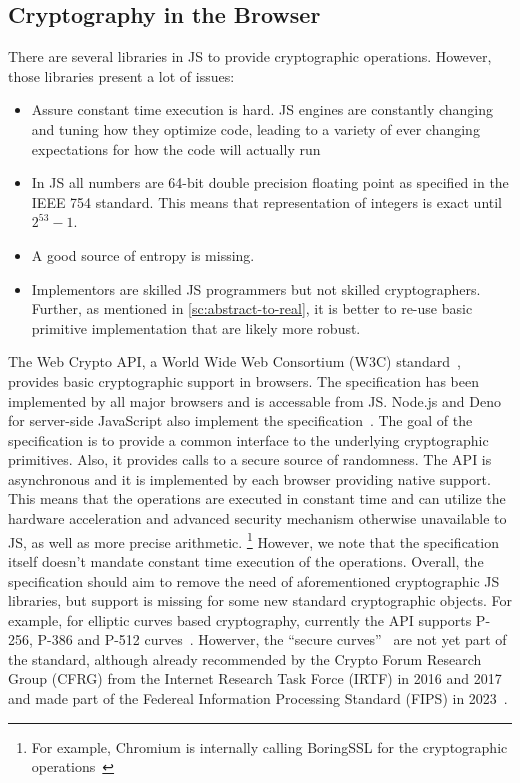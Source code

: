 \subsection{Cryptography in the Browser}\label{sc:webcrypto-api}

There are several libraries in JS to provide cryptographic
operations.
However, those libraries present a lot of issues:
\begin{itemize}
    \item Assure constant time execution is hard. JS engines are constantly changing and tuning how they optimize code, leading to a variety of ever changing expectations for how the code will actually run
    \item In JS all numbers are 64-bit double precision floating point as specified in the IEEE 754 standard. This means that representation of integers is exact until $2^{53} - 1$.
    \item A good source of entropy is missing.
    \item Implementors are skilled JS programmers but not skilled cryptographers. Further, as mentioned in \cref{sc:abstract-to-real}, it is better to re-use basic primitive implementation that are likely more robust. 
\end{itemize}

The Web Crypto API, a World Wide Web Consortium (W3C) standard~\cite{WebCryptoAPISpecification}, 
provides basic cryptographic support in browsers.
The specification has been implemented by all major browsers
and is accessable from JS. 
Node.js and Deno for server-side JavaScript also implement the specification~\cite{NodeJsWebCryptoAPI, DenoWebCryptoAPI}.
The goal of the specification
is to provide a common interface to the underlying 
cryptographic primitives. Also, it provides calls to
a secure source of randomness. 
The API is asynchronous and it is implemented by each
browser providing native support. This means that the
operations are executed in constant time and can
utilize the hardware acceleration and advanced
security mechanism otherwise unavailable to JS, as well as
more precise arithmetic.
\footnote{For example, Chromium is internally calling BoringSSL for the cryptographic operations~\cite{ChromiumWebCryptoAPIImplementation}}
However, we note that the specification itself doesn't mandate
constant time execution of the operations.
Overall, the specification should aim to 
remove the need of aforementioned cryptographic JS libraries,
but support is missing for some new standard cryptographic objects. 
For example, for elliptic curves based cryptography, currently
the API supports P-256, P-386 and P-512 curves~\cite{WebCryptoAPICurvesSupport}.
Howerver, the ``secure curves''~\cite{WebCryptoAPISecureCurvesDraft,WebCryptoAPISecureCurvesExplainer}
are not yet part of the standard, although already recommended by
the Crypto Forum Research Group (CFRG) from the Internet Research
Task Force (IRTF) in 2016 and 2017~\cite{RFC7748IRTF, RFC8032IRTF}
and made part of the Federeal Information Processing Standard (FIPS) in 2023~\cite{SecureCurvesNIST}.

